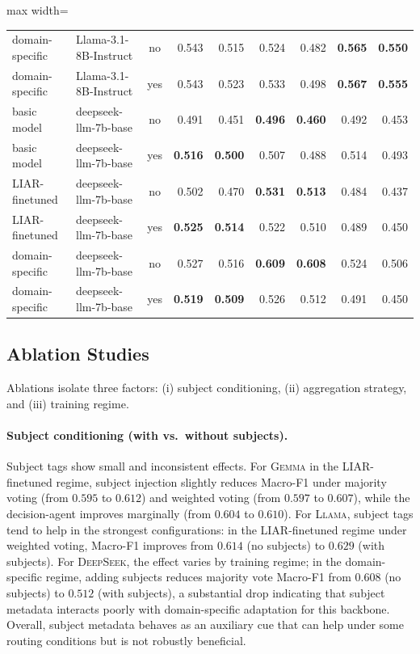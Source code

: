 \begin{table}[t]
\begin{adjustbox}{max width=\textwidth}
\begin{tabular}{@{}l p{2.8cm} c rr rr rr@{}}
domain-specific & Llama-3.1-8B-Instruct & no  & 0.543 & 0.515          & 0.524 & 0.482          & \textbf{0.565} & \textbf{0.550} \\
domain-specific & Llama-3.1-8B-Instruct & yes & 0.543 & 0.523          & 0.533 & 0.498          & \textbf{0.567} & \textbf{0.555} \\
\midrule
basic model     & deepseek-llm-7b-base  & no  & 0.491 & 0.451          & \textbf{0.496} & \textbf{0.460} & 0.492 & 0.453 \\
basic model     & deepseek-llm-7b-base  & yes & \textbf{0.516} & \textbf{0.500} & 0.507 & 0.488        & 0.514 & 0.493 \\
LIAR-finetuned  & deepseek-llm-7b-base  & no  & 0.502 & 0.470          & \textbf{0.531} & \textbf{0.513} & 0.484 & 0.437 \\
LIAR-finetuned  & deepseek-llm-7b-base  & yes & \textbf{0.525} & \textbf{0.514} & 0.522 & 0.510        & 0.489 & 0.450 \\
domain-specific & deepseek-llm-7b-base  & no  & 0.527 & 0.516          & \textbf{0.609} & \textbf{0.608} & 0.524 & 0.506 \\
domain-specific & deepseek-llm-7b-base  & yes & \textbf{0.519} & \textbf{0.509} & 0.526 & 0.512        & 0.491 & 0.450 \\
\bottomrule
\end{tabular}
\end{adjustbox}
\end{table}

\subsection{Ablation Studies}

Ablations isolate three factors: (i) subject conditioning, (ii) aggregation strategy, and (iii) training regime.

\paragraph{Subject conditioning (with vs.\ without subjects).}
Subject tags show small and inconsistent effects.
For \textsc{Gemma} in the LIAR-finetuned regime, subject injection slightly reduces Macro-F1 under majority voting (from $0.595$ to $0.612$) and weighted voting (from $0.597$ to $0.607$), while the decision-agent improves marginally (from $0.604$ to $0.610$).
For \textsc{Llama}, subject tags tend to help in the strongest configurations: in the LIAR-finetuned regime under weighted voting, Macro-F1 improves from $0.614$ (no subjects) to $0.629$ (with subjects).
For \textsc{DeepSeek}, the effect varies by training regime; in the domain-specific regime, adding subjects reduces majority vote Macro-F1 from $0.608$ (no subjects) to $0.512$ (with subjects), a substantial drop indicating that subject metadata interacts poorly with domain-specific adaptation for this backbone.
Overall, subject metadata behaves as an auxiliary cue that can help under some routing conditions but is not robustly beneficial.

